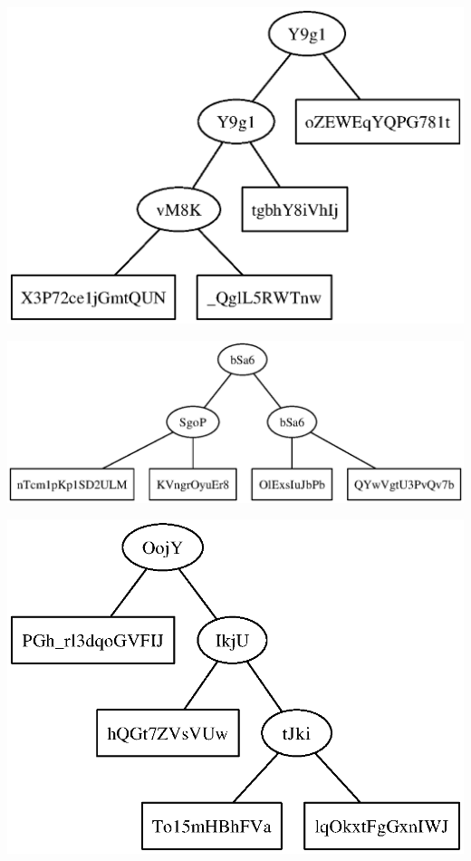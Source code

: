 \documentclass[english]{article}
\begin{document}

\includegraphics[scale=.5]{kap3OptimaleSB1.la.dot.ps}


\includegraphics[scale=.5]{kap3OptimaleSB2.la.dot.ps}


\includegraphics[scale=.5]{kap3OptimaleSB3.la.dot.ps}
\end{document}
